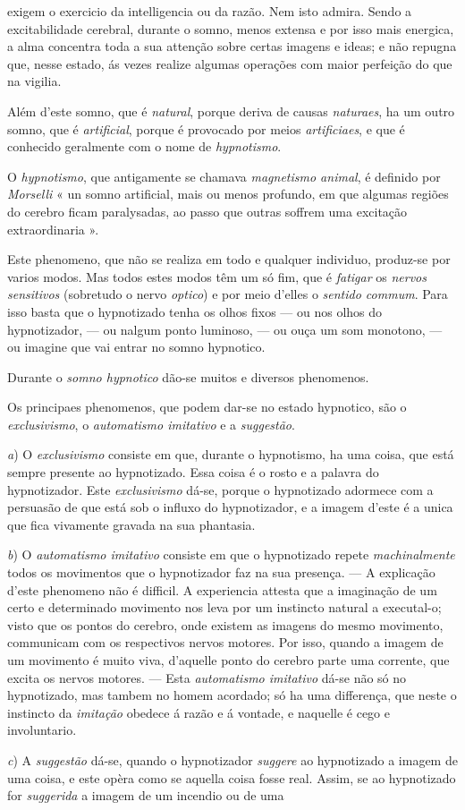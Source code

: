 exigem o exercicio da intelligencia ou da razão. Nem isto admira. Sendo a excitabilidade cerebral, durante o somno, menos extensa e por isso mais energica, a alma concentra toda a sua attenção sobre certas imagens e ideas; e não repugna que, nesse estado, ás vezes realize algumas operações com maior perfeição do que na vigilia.\par Além d'este somno, que é \emph{natural}, porque deriva de causas \emph{naturaes}, ha um outro somno, que é \emph{artificial}, porque é provocado por meios \emph{artificiaes}, e que é conhecido geralmente com o nome de \emph{hypnotismo}.\par O \emph{hypnotismo}, que antigamente se chamava \emph{magnetismo animal}, é definido por \emph{Morselli} « un somno artificial, mais ou menos profundo, em que algumas regiões do cerebro ficam paralysadas, ao passo que outras soffrem uma excitação extraordinaria ».\par Este phenomeno, que não se realiza em todo e qualquer individuo, produz-se por varios modos. Mas todos estes modos têm um só fim, que é \emph{fatigar} os \emph{nervos sensitivos} (sobretudo o nervo \emph{optico}) e por meio d'elles o \emph{sentido commum}. Para isso basta que o hypnotizado tenha os olhos fixos --- ou nos olhos do hypnotizador, --- ou nalgum ponto luminoso, --- ou ouça um som monotono, --- ou imagine que vai entrar no somno hypnotico.\par Durante o \emph{somno hypnotico} dão-se muitos e diversos phenomenos.\par Os principaes phenomenos, que podem dar-se no estado hypnotico, são o \emph{exclusivismo}, o \emph{automatismo imitativo} e a \emph{suggestão}.\par \emph{a}) O \emph{exclusivismo} consiste em que, durante o hypnotismo, ha uma coisa, que está sempre presente ao hypnotizado. Essa coisa é o rosto e a palavra do hypnotizador. Este \emph{exclusivismo} dá-se, porque o hypnotizado adormece com a persuasão de que está sob o influxo do hypnotizador, e a imagem d'este é a unica que fica vivamente gravada na sua phantasia.\par \emph{b}) O \emph{automatismo imitativo} consiste em que o hypnotizado repete \emph{machinalmente} todos os movimentos que o hypnotizador faz na sua presença. --- A explicação d'este phenomeno não é difficil. A experiencia attesta que a imaginação de um certo e determinado movimento nos leva por um instincto natural a executal-o; visto que os pontos do cerebro, onde existem as imagens do mesmo movimento, communicam com os respectivos nervos motores. Por isso, quando a imagem de um movimento é muito viva, d'aquelle ponto do cerebro parte uma corrente, que excita os nervos motores. --- Esta \emph{automatismo imitativo} dá-se não só no hypnotizado, mas tambem no homem acordado; só ha uma differença, que neste o instincto da \emph{imitação} obedece á razão e á vontade, e naquelle é cego e involuntario.\par \emph{c}) A \emph{suggestão} dá-se, quando o hypnotizador \emph{suggere} ao hypnotizado a imagem de uma coisa, e este opèra como se aquella coisa fosse real. Assim, se ao hypnotizado for \emph{suggerida} a imagem de um incendio ou de uma 